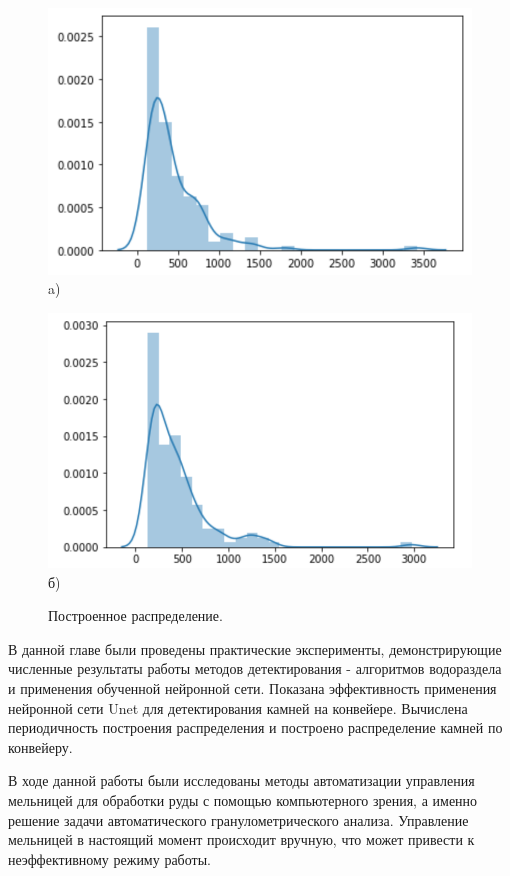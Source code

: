 \documentclass[times]{itmo-student-thesis}
\begin{document}
\begin{figure}[h]
	\begin{minipage}[h]{0.49\linewidth}
		\centering
		\includegraphics[width=0.8\linewidth]{images/raspr} \\ a)
	\end{minipage}
	\hfill
	\begin{minipage}[h]{0.49\linewidth}
		\centering
		\includegraphics[width=0.8\linewidth]{images/raspr2} \\ б)
	\end{minipage}
	\caption{Построенное распределение.}
	\label{fig:rasp}
\end{figure}


\chapterconclusion
В данной главе были проведены практические эксперименты, демонстрирующие численные результаты работы методов детектирования - алгоритмов водораздела и применения обученной нейронной сети. Показана эффективность применения нейронной сети Unet для детектирования камней на конвейере. Вычислена периодичность построения распределения и построено распределение камней по конвейеру.


\startconclusionpage
В ходе данной работы были исследованы методы автоматизации управления мельницей для обработки руды с помощью компьютерного зрения, а именно решение задачи автоматического гранулометрического анализа. Управление мельницей в настоящий момент происходит вручную, что может привести к неэффективному режиму работы.
\end{document}
